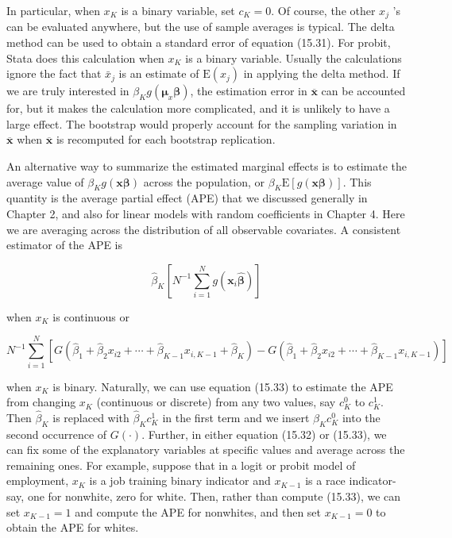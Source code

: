 \documentclass[10pt]{article}
\begin{document}
In particular, when $x_{K}$ is a binary variable, set $c_{K}=0$. Of course, the other $x_{j}$ 's can be evaluated anywhere, but the use of sample averages is typical. The delta method can be used to obtain a standard error of equation (15.31). For probit, Stata does this calculation when $x_{K}$ is a binary variable. Usually the calculations ignore the fact that $\bar{x}_{j}$ is an estimate of $\mathrm{E}\left(x_{j}\right)$ in applying the delta method. If we are truly interested in $\beta_{K} g\left(\boldsymbol{\mu}_{x} \boldsymbol{\beta}\right)$, the estimation error in $\overline{\mathbf{x}}$ can be accounted for, but it makes the calculation more complicated, and it is unlikely to have a large effect. The bootstrap would properly account for the sampling variation in $\overline{\mathbf{x}}$ when $\overline{\mathbf{x}}$ is recomputed for each bootstrap replication.

An alternative way to summarize the estimated marginal effects is to estimate the average value of $\beta_{K} g(\mathbf{x} \boldsymbol{\beta})$ across the population, or $\beta_{K} \mathrm{E}[g(\mathbf{x} \boldsymbol{\beta})]$. This quantity is the average partial effect (APE) that we discussed generally in Chapter 2, and also for linear models with random coefficients in Chapter 4. Here we are averaging across the distribution of all observable covariates. A consistent estimator of the APE is


\begin{equation*}
\hat{\beta}_{K}\left[N^{-1} \sum_{i=1}^{N} g\left(\mathbf{x}_{i} \hat{\boldsymbol{\beta}}\right)\right] \tag{15.32}
\end{equation*}


when $x_{K}$ is continuous or


\begin{equation*}
N^{-1} \sum_{i=1}^{N}\left[G\left(\hat{\beta}_{1}+\hat{\beta}_{2} x_{i 2}+\cdots+\hat{\beta}_{K-1} x_{i, K-1}+\hat{\beta}_{K}\right)-G\left(\hat{\beta}_{1}+\hat{\beta}_{2} x_{i 2}+\cdots+\hat{\beta}_{K-1} x_{i, K-1}\right)\right] \tag{15.33}
\end{equation*}


when $x_{K}$ is binary. Naturally, we can use equation (15.33) to estimate the APE from changing $x_{K}$ (continuous or discrete) from any two values, say $c_{K}^{0}$ to $c_{K}^{1}$. Then $\hat{\beta}_{K}$ is replaced with $\hat{\beta}_{K} c_{K}^{1}$ in the first term and we insert $\hat{\beta}_{K} c_{K}^{0}$ into the second occurrence of $G(\cdot)$. Further, in either equation (15.32) or (15.33), we can fix some of the explanatory variables at specific values and average across the remaining ones. For example, suppose that in a logit or probit model of employment, $x_{K}$ is a job training binary indicator and $x_{K-1}$ is a race indicator-say, one for nonwhite, zero for white. Then, rather than compute (15.33), we can set $x_{K-1}=1$ and compute the APE for nonwhites, and then set $x_{K-1}=0$ to obtain the APE for whites.
\end{document}
